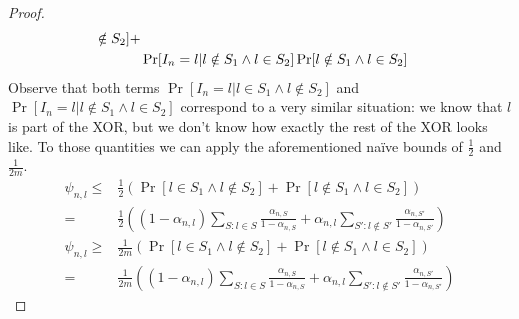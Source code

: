 \begin{proof}
\begin{align}
        \notin S_2] + \notag\\
    & \Pr[I_n = l | l \notin S_1 \wedge l \in S_2] \Pr[l \notin S_1 \wedge l
        \in S_2]
  \end{align}
  Observe that both terms $\Pr[I_n = l | l \in S_1 \wedge l \notin S_2]$ and
  $\Pr[I_n = l | l \notin S_1 \wedge l \in S_2]$ correspond to a very similar
  situation: we know that $l$ is part of the XOR, but we don't know how exactly
  the rest of the XOR looks like. To those quantities we can apply the
  aforementioned naïve bounds of $\frac{1}{2}$ and $\frac{1}{2m}$.
  \begin{align}
    \psi_{n, l} \leq& \frac{1}{2} (\Pr[l \in S_1 \wedge l \notin S_2] + \Pr[l
        \notin S_1 \wedge l \in S_2]) \\
      =& \frac{1}{2}((1 - \alpha_{n, l}) \sum_{S: l \in S} \frac{\alpha_{n,
          S}}{1 - \alpha_{n, S}} + \alpha_{n, l} \sum_{S': l \notin S'}
          \frac{\alpha_{n, S'}}{1 - \alpha_{n, S'}}) \\
    \psi_{n, l} \geq& \frac{1}{2m} (\Pr[l \in S_1 \wedge l \notin S_2] + \Pr[l
        \notin S_1 \wedge l \in S_2]) \\
      =& \frac{1}{2m}((1 - \alpha_{n, l}) \sum_{S: l \in S} \frac{\alpha_{n,
          S}}{1 - \alpha_{n, S}} + \alpha_{n, l} \sum_{S': l \notin S'}
          \frac{\alpha_{n, S'}}{1 - \alpha_{n, S'}})
  \end{align}
\end{proof}

